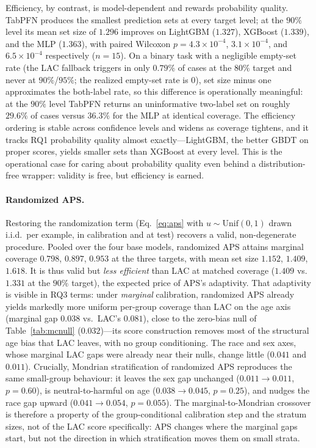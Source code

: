 \documentclass[review,12pt]{elsarticle}
\begin{document}
Efficiency, by contrast, is model-dependent and rewards probability quality. TabPFN produces the smallest prediction sets at every target level; at the $90\%$ level its mean set size of $1.296$ improves on LightGBM ($1.327$), XGBoost ($1.339$), and the MLP ($1.363$), with paired Wilcoxon $p = 4.3\times10^{-4}$, $3.1\times10^{-4}$, and $6.5\times10^{-4}$ respectively ($n=15$). On a binary task with a negligible empty-set rate (the LAC fallback triggers in only $0.79\%$ of cases at the $80\%$ target and never at $90\%$/$95\%$; the realized empty-set rate is $0$), set size minus one approximates the both-label rate, so this difference is operationally meaningful: at the $90\%$ level TabPFN returns an uninformative two-label set on roughly $29.6\%$ of cases versus $36.3\%$ for the MLP at identical coverage. The efficiency ordering is stable across confidence levels and widens as coverage tightens, and it tracks RQ1 probability quality almost exactly---LightGBM, the better GBDT on proper scores, yields smaller sets than XGBoost at every level. This is the operational case for caring about probability quality even behind a distribution-free wrapper: validity is free, but efficiency is earned.

\paragraph{Randomized APS.}
Restoring the randomization term (Eq.~\eqref{eq:aps} with $u\sim\mathrm{Unif}(0,1)$ drawn i.i.d.\ per example, in calibration and at test) recovers a valid, non-degenerate procedure. Pooled over the four base models, randomized APS attains marginal coverage $0.798$, $0.897$, $0.953$ at the three targets, with mean set size $1.152$, $1.409$, $1.618$. It is thus valid but \emph{less efficient} than LAC at matched coverage ($1.409$ vs.\ $1.331$ at the $90\%$ target), the expected price of APS's adaptivity. That adaptivity is visible in RQ3 terms: under \emph{marginal} calibration, randomized APS already yields markedly more uniform per-group coverage than LAC on the age axis (marginal gap $0.038$ vs.\ LAC's $0.081$), close to the zero-bias null of Table~\ref{tab:mcnull} ($0.032$)---its score construction removes most of the structural age bias that LAC leaves, with no group conditioning. The race and sex axes, whose marginal LAC gaps were already near their nulls, change little ($0.041$ and $0.011$). Crucially, Mondrian stratification of randomized APS reproduces the same small-group behaviour: it leaves the sex gap unchanged ($0.011\!\to\!0.011$, $p=0.60$), is neutral-to-harmful on age ($0.038\!\to\!0.045$, $p=0.25$), and nudges the race gap upward ($0.041\!\to\!0.054$, $p=0.055$). The marginal-to-Mondrian crossover is therefore a property of the group-conditional calibration step and the stratum sizes, not of the LAC score specifically: APS changes where the marginal gaps start, but not the direction in which stratification moves them on small strata.
\end{document}
